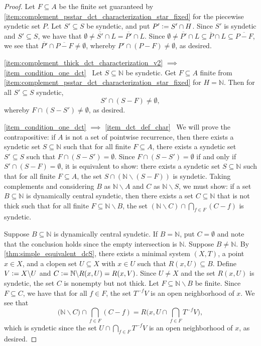 \documentclass[letter,11pt]{article}
\theoremstyle{plain}
\theoremstyle{definition}
\theoremstyle{plain}
\theoremstyle{plain}
\numberwithin{equation}{section}
\newcommand{\N}{\mathbb{N}}
\newcommand{\defeq}{\vcentcolon=}
\renewcommand{\setminus}{\backslash}
\begin{document}
\begin{proof}
    Let $F \subseteq A$ be the finite set guaranteed by \eqref{item:complement_psstar_dct_characterization_star_fixed} for the piecewise syndetic set $P$.  Let $S' \subseteq S$ be syndetic, and put $P' \defeq S' \cap H$. Since $S'$ is syndetic and $S' \subseteq S$, we have that $\emptyset \neq \overline{S'} \cap L = \overline{P'} \cap L$.  Since $\emptyset \neq \overline{P'} \cap L \subseteq \overline{P} \cap L \subseteq \overline{P-F}$, we see that $\overline{P'} \cap \overline{P-F} \neq \emptyset$, whereby $P' \cap (P-F) \neq \emptyset$, as desired.
    
    \eqref{item:complement_thick_dct_characterization_v2} $\implies$ \eqref{item_condition_one_dct} \ Let $S \subseteq \N$ be syndetic.  Get $F \subseteq A$ finite from \eqref{item:complement_psstar_dct_characterization_star_fixed} for $H = \N$.  Then for all $S' \subseteq S$ syndetic,
    \[S' \cap (S-F) \neq \emptyset,\]
    whereby $F \cap (S-S') \neq \emptyset$, as desired.

    \eqref{item_condition_one_dct} $\implies$ \eqref{item_dct_def_char} \ We will prove the contrapositive: if $A$ is not a set of pointwise recurrence, then there exists a syndetic set $S \subseteq \N$ such that for all finite $F \subseteq A$, there exists a syndetic set $S' \subseteq S$ such that $F \cap (S - S') = \emptyset$. Since $F \cap (S - S') = \emptyset$ if and only if $S' \cap (S - F) = \emptyset$, it is equivalent to show: there exists a syndetic set $S \subseteq \N$ such that for all finite $F \subseteq A$, the set $S \cap (\N \setminus (S-F))$ is syndetic.  Taking complements and considering $B$ as $\N \setminus A$ and $C$ as $\N \setminus S$, we must show: if a set $B \subseteq \N$ is dynamically central syndetic, then there exists a set $C \subseteq \N$ that is not thick such that for all finite $F \subseteq \N \setminus B$, the set $(\N \setminus C) \cap \bigcap_{f \in F} (C - f)$ is syndetic.

    Suppose $B \subseteq \N$ is dynamically central syndetic.  If $B = \N$, put $C = \emptyset$ and note that the conclusion holds since the empty intersection is $\N$. Suppose $B \neq \N$. By \cref{thm:simple_equivalent_dcS}, there exists a minimal system $(X,T)$, a point $x \in X$, and a clopen set $U \subseteq X$ with $x \in U$ such that $R(x,U) \subseteq B$.  Define $V \defeq X \setminus U$ and $C \defeq \N \setminus R(x,U) = R(x, V)$. Since $U \neq X$ and the set $R(x,U)$ is syndetic, the set $C$ is nonempty but not thick.  Let $F \subseteq \N \setminus B$ be finite.  Since $F \subseteq C$, we have that for all $f \in F$, the set $T^{-f}V$ is an open neighborhood of $x$.  We see that
    \[\big(\N \setminus C\big) \cap \bigcap_{f \in F} (C - f) = R\bigg( x, U \cap \bigcap_{f \in F}T^{-f}V \bigg),\]
    which is syndetic since the set $U \cap \bigcap_{f \in F}T^{-f}V$ is an open neighborhood of $x$, as desired.
\end{proof}
\end{document}
